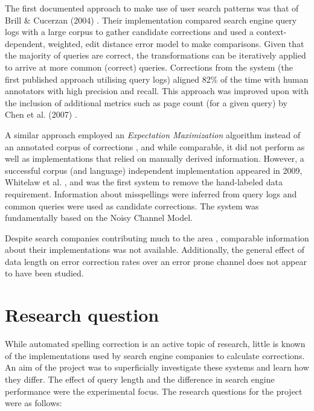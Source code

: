 \documentclass{csfourzero}
\begin{document}
The first documented approach to make use of user search patterns was that of Brill \& Cucerzan (2004) \cite{webuserpoweredspelling}. Their implementation compared search engine query logs with a large corpus to gather candidate corrections and used a context-dependent, weighted, edit distance error model to make comparisons. Given that the majority of queries are correct, the transformations can be iteratively applied to arrive at more common (correct) queries. Corrections from the system (the first published approach utilising query logs) aligned 82\% of the time with human annotators with high precision and recall. This approach was improved upon with the inclusion of additional metrics such as page count (for a given query) by Chen et al. (2007) \cite{webuser3}.

A similar approach employed an \textit{Expectation Maximization} algorithm instead of an annotated corpus of corrections \cite{webuser2learningerrormodel}, and while comparable, it did not perform as well as implementations that relied on manually derived information. However, a successful corpus (and language) independent implementation appeared in 2009, Whitelaw et al. \cite{webuser4google2009}, and was the first system to remove the hand-labeled data requirement. Information about misspellings were inferred from query logs and common queries were used as candidate corrections. The system was fundamentally based on the Noisy Channel Model.

Despite search companies contributing much to the area \cite{webuser3, webuserpoweredspelling, microranker, microphone, webuser4google2009}, comparable information about their implementations was not available. Additionally, the general effect of data length on error correction rates over an error prone channel does not appear to have been studied.

\section{Research question}
\label{sec:rq}

While automated spelling correction is an active topic of research, little is known of the implementations used by search engine companies to calculate corrections. An aim of the project was to superficially investigate these systems and learn how they differ. The effect of query length and the difference in search engine performance were the experimental focus. The research questions for the project were as follows:
\end{document}

